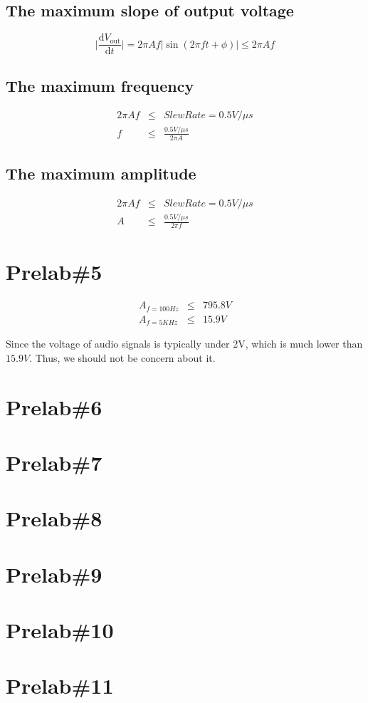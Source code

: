 \documentclass{IEEEtran}
\begin{document}
	\subsection{The maximum slope of output voltage}
	\begin{equation}
		\bigg|\frac{\mathrm{d}V_{\mathrm{out}}}{\mathrm{d}t}\bigg| = 2\pi Af|\sin(2\pi ft+\phi)| \le 2\pi Af
	\end{equation}
	\subsection{The maximum frequency}
	\begin{eqnarray}
		2\pi Af & \le & SlewRate = 0.5\si{V/\mu s} \\
		f & \le & \frac{0.5\si{V/\mu s}}{2\pi A}
	\end{eqnarray}
	\subsection{The maximum amplitude}
	\begin{eqnarray}
		2\pi Af & \le & SlewRate = 0.5\si{V/\mu s} \\
		A & \le & \frac{0.5\si{V/\mu s}}{2\pi f}
	\end{eqnarray}
	
	\section{\textbf{Prelab\#5}}
	\begin{eqnarray}
		A_{f=100\si{Hz}} & \le & 795.8\si{V} \\
		A_{f=5\si{KHz}} & \le & 15.9\si{V}
	\end{eqnarray}
		
	Since the voltage of audio signals is typically under 2V, which is much lower than $15.9\si{V}$. Thus, we should not be concern about it.
	
	\section{\textbf{Prelab\#6}}
	
	
	\section{\textbf{Prelab\#7}}
	\section{\textbf{Prelab\#8}}
	\section{\textbf{Prelab\#9}}
	\section{\textbf{Prelab\#10}}
	\section{\textbf{Prelab\#11}}
\end{document}
